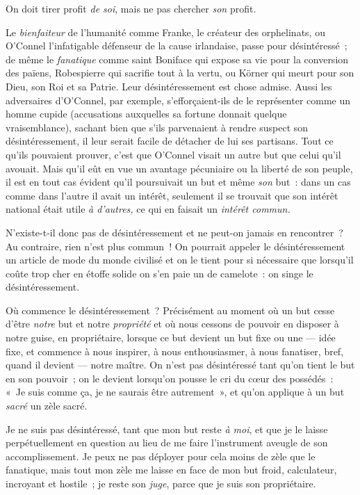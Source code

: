 \documentclass[french,twoside]{book} %
\begin{document}
On doit tirer profit \emph{de soi}, mais ne pas chercher \emph{son} profit.\par
Le \emph{bienfaiteur} de l’humanité comme Franke, le créateur des orphelinats, ou O’Connel l’infatigable défenseur de la cause irlandaise, passe pour désintéressé ; de même le \emph{fanatique} comme saint Boniface qui expose sa vie pour la conversion des païens, Robespierre qui sacrifie tout à la vertu, ou Körner qui meurt pour son Dieu, son Roi et sa Patrie. Leur désintéressement est chose admise. Aussi les adversaires d’O’Connel, par exemple, s’efforçaient-ils de  le représenter comme un homme cupide (accusations auxquelles sa fortune donnait quelque vraisemblance), sachant bien que s’ils parvenaient à rendre suspect son désintéressement, il leur serait facile de détacher de lui ses partisans. Tout ce qu’ils pouvaient prouver, c’est que O’Connel visait un autre but que celui qu’il avouait. Mais qu’il eût en vue un avantage pécuniaire ou la liberté de son peuple, il est en tout cas évident qu’il poursuivait un but et même \emph{son }but : dans un cas comme dans l’autre il avait un intérêt, seulement il se trouvait que son intérêt national était utile \emph{à d’autres,} ce qui en faisait un \emph{intérêt commun.}\par
N’existe-t-il donc pas de désintéressement et ne peut-on jamais en rencontrer ? Au contraire, rien n’est plus commun ! On pourrait appeler le désintéressement un article de mode du monde civilisé et on le tient pour si nécessaire que lorsqu’il coûte trop cher en étoffe solide on s’en paie un de camelote : on singe le désintéressement.\par
Où commence le désintéressement ? Précisément au moment où un but cesse d’être \emph{notre} but et notre \emph{propriété} et où nous cessons de pouvoir en disposer à notre guise, en propriétaire, lorsque ce but devient un but fixe ou une — idée fixe, et commence à nous inspirer, à nous enthousiasmer, à nous fanatiser, bref, quand il devient — notre maître. On n’est pas désintéressé tant qu’on tient le but en son pouvoir ; on le devient lorsqu’on pousse le cri du cœur des possédés : « Je suis comme ça, je ne saurais être autrement », et qu’on applique à un but \emph{sacré} un zèle sacré.\par
Je ne suis pas désintéressé, tant que mon but reste \emph{à moi}, et que je le laisse perpétuellement en question au lieu de me faire l’instrument aveugle de son accomplissement. Je peux ne pas déployer pour cela moins de zèle que le fanatique, mais tout mon zèle me laisse en face de mon but froid, calculateur, incroyant  et hostile ; je reste son \emph{juge}, parce que je suis son propriétaire.\par
\end{document}
